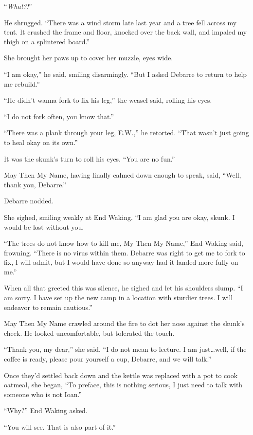 ``\emph{What?!}''

He shrugged. ``There was a wind storm late last year and a tree fell across my tent. It crushed the frame and floor, knocked over the back wall, and impaled my thigh on a splintered board.''

She brought her paws up to cover her muzzle, eyes wide.

``I am okay,'' he said, smiling disarmingly. ``But I asked Debarre to return to help me rebuild.''

``He didn't wanna fork to fix his leg,'' the weasel said, rolling his eyes.

``I do not fork often, you know that.''

``There was a plank through your leg, E.W.,'' he retorted. ``That wasn't just going to heal okay on its own.''

It was the skunk's turn to roll his eyes. ``You are no fun.''

May Then My Name, having finally calmed down enough to speak, said, ``Well, thank you, Debarre.''

Debarre nodded.

She sighed, smiling weakly at End Waking. ``I am glad you are okay, skunk. I would be lost without you.

``The trees do not know how to kill me, My Then My Name,'' End Waking said, frowning. ``There is no virus within them. Debarre was right to get me to fork to fix, I will admit, but I would have done so anyway had it landed more fully on me.''

When all that greeted this was silence, he sighed and let his shoulders slump. ``I am sorry. I have set up the new camp in a location with sturdier trees. I will endeavor to remain cautious.''

May Then My Name crawled around the fire to dot her nose against the skunk's cheek. He looked uncomfortable, but tolerated the touch.

``Thank you, my dear,'' she said. ``I do not mean to lecture. I am just\ldots well, if the coffee is ready, please pour yourself a cup, Debarre, and we will talk.''

Once they'd settled back down and the kettle was replaced with a pot to cook oatmeal, she began, ``To preface, this is nothing serious, I just need to talk with someone who is not Ioan.''

``Why?'' End Waking asked.

``You will see. That is also part of it.''

